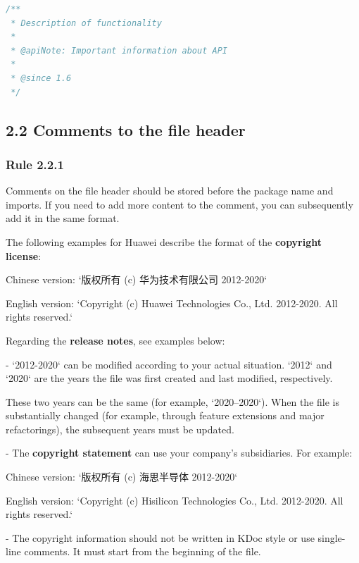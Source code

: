 \begin{lstlisting}[language=Kotlin]
/**
 * Description of functionality
 *
 * @apiNote: Important information about API
 *
 * @since 1.6
 */
\end{lstlisting}
\subsection*{\textbf{2.2 Comments to the file header}}

\subsubsection*{\textbf{Rule 2.2.1}}
\leavevmode\newline



Comments on the file header should be stored before the package name and imports. If you need to add more content to the comment, you can subsequently add it in the same format.



The following examples for Huawei describe the format of the \textbf{copyright license}: \

Chinese version: `版权所有 (c) 华为技术有限公司 2012-2020` \

English version: `Copyright (c) Huawei Technologies Co., Ltd. 2012-2020. All rights reserved.`



Regarding the \textbf{release notes}, see examples below:



- `2012-2020` can be modified according to your actual situation. `2012` and `2020` are the years the file was first created and last modified, respectively.

These two years can be the same (for example, `2020–2020`). When the file is substantially changed (for example, through feature extensions and major refactorings), the subsequent years must be updated.



- The \textbf{copyright statement} can use your company's subsidiaries. For example: \

Chinese version: `版权所有 (c) 海思半导体 2012-2020` \

English version: `Copyright (c) Hisilicon Technologies Co., Ltd. 2012-2020. All rights reserved.` 



- The copyright information should not be written in KDoc style or use single-line comments. It must start from the beginning of the file.

